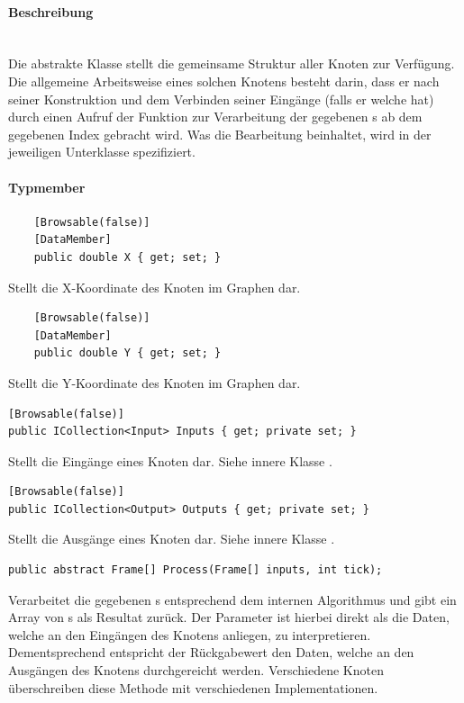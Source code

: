 \paragraph{Beschreibung}~\\
Die abstrakte Klasse  stellt die gemeinsame Struktur aller Knoten zur Verfügung. Die allgemeine Arbeitsweise eines solchen Knotens besteht darin, dass er nach seiner Konstruktion und dem Verbinden seiner Eingänge (falls er welche hat) durch einen Aufruf der Funktion  zur Verarbeitung der gegebenen s ab dem gegebenen Index gebracht wird. Was die Bearbeitung beinhaltet, wird in der jeweiligen Unterklasse spezifiziert.

\paragraph{Typmember}
\begin{itemize}

	\begin{verbatim}
	[Browsable(false)]
	[DataMember]
	public double X { get; set; }
	\end{verbatim}
	Stellt die X-Koordinate des Knoten im Graphen dar.

	\begin{verbatim}
	[Browsable(false)]
	[DataMember]
	public double Y { get; set; }
	\end{verbatim}
	Stellt die Y-Koordinate des Knoten im Graphen dar.

	\begin{verbatim}
[Browsable(false)]
public ICollection<Input> Inputs { get; private set; }
	\end{verbatim}
Stellt die Eingänge eines Knoten dar. Siehe innere Klasse .

	\begin{verbatim}
[Browsable(false)]
public ICollection<Output> Outputs { get; private set; }
	\end{verbatim}
Stellt die Ausgänge eines Knoten dar. Siehe innere Klasse .

	\begin{verbatim}
public abstract Frame[] Process(Frame[] inputs, int tick);
	\end{verbatim}
	Verarbeitet die gegebenen s entsprechend dem internen Algorithmus und gibt ein Array von s als Resultat zurück. Der Parameter  ist hierbei direkt als die Daten, welche an den Eingängen des Knotens anliegen, zu interpretieren. Dementsprechend entspricht der Rückgabewert den Daten, welche an den Ausgängen des Knotens durchgereicht werden. Verschiedene Knoten überschreiben diese Methode mit verschiedenen Implementationen.


\end{itemize}

